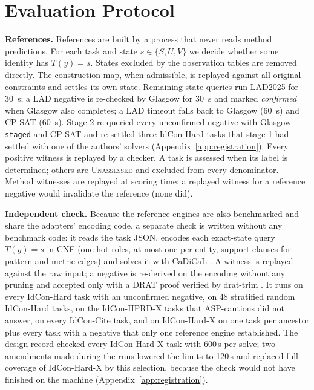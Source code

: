 \section{Evaluation Protocol}
\label{sec:protocol}
\textbf{References.} References are built by a process that never reads method predictions. For each task and state $s\in\{S,U,V\}$ we decide whether some identity has $T(y)=s$. States excluded by the observation tables are removed directly. The construction map, when admissible, is replayed against all original constraints and settles its own state. Remaining state queries run LAD2025 for 30~s; a LAD negative is re-checked by Glasgow for 30~s and marked \emph{confirmed} when Glasgow also completes; a LAD timeout falls back to Glasgow (60~s) and CP-SAT (60~s). Stage 2 re-queried every unconfirmed negative with Glasgow \texttt{-{}-staged} and CP-SAT and re-settled three IdCon-Hard tasks that stage 1 had settled with one of the authors' solvers (Appendix~\ref{app:registration}). Every positive witness is replayed by a checker. A task is assessed when its label is determined; others are \textsc{Unassessed} and excluded from every denominator. Method witnesses are replayed at scoring time; a replayed witness for a reference negative would invalidate the reference (none did).

\textbf{Independent check.} Because the reference engines are also benchmarked and share the adapters' encoding code, a separate check is written without any benchmark code: it reads the task JSON, encodes each exact-state query $T(y)=s$ in CNF (one-hot roles, at-most-one per entity, support clauses for pattern and metric edges) and solves it with CaDiCaL \cite{cadical}. A witness is replayed against the raw input; a negative is re-derived on the encoding without any pruning and accepted only with a DRAT proof verified by drat-trim \cite{drattrim}. It runs on every IdCon-Hard task with an unconfirmed negative, on 48 stratified random IdCon-Hard tasks, on the IdCon-HPRD-X tasks that ASP-cautious did not answer, on every IdCon-Cite task, and on IdCon-Hard-X on one task per ancestor plus every task with a negative that only one reference engine established. The design record checked every IdCon-Hard-X task with 600\,s per solve; two amendments made during the runs lowered the limits to 120\,s and replaced full coverage of IdCon-Hard-X by this selection, because the check would not have finished on the machine (Appendix~\ref{app:registration}).


